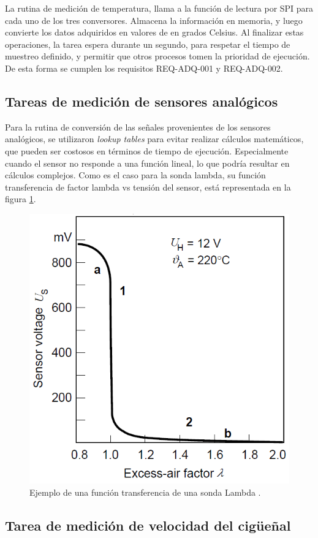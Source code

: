 La rutina de medición de temperatura, llama a la función de lectura por SPI para cada uno de los tres conversores. Almacena la información en memoria, y luego convierte los datos adquiridos en valores de en grados Celsius. Al finalizar estas operaciones, la tarea espera durante un segundo, para respetar el tiempo de muestreo definido, y permitir que otros procesos tomen la prioridad de ejecución. De esta forma se cumplen los requisitos REQ-ADQ-001 y REQ-ADQ-002.

\subsection{Tareas de medición de sensores analógicos}

Para la rutina de conversión de las señales provenientes de los sensores analógicos, se utilizaron \textit{lookup tables} para evitar realizar cálculos matemáticos, que pueden ser costosos en términos de tiempo de ejecución. Especialmente cuando el sensor no responde a una función lineal, lo que podría resultar en cálculos complejos. Como es el caso para la sonda lambda, su función transferencia de factor lambda vs tensión del sensor, está representada en la figura \ref{fig:funcion-lambda}.

\begin{figure}[htpb]
\centering
\includegraphics[width=.55\textwidth]{./Figures/funcion-lambda.png}
\caption{Ejemplo de una función transferencia de una sonda Lambda \protect\footnotemark[3].}
\label{fig:funcion-lambda}
\end{figure}

\subsection{Tarea de medición de velocidad del cigüeñal}

